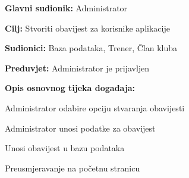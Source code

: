 \documentclass[times, utf8, zavrsni]{fer}
\newenvironment{packed_enum}{
	\begin{enumerate}
		\setlength{\itemsep}{0pt}
		\setlength{\parskip}{0pt}
		\setlength{\parsep}{0pt}
	}{\end{enumerate}}
\newenvironment{packed_item}{
	\begin{itemize}
		\setlength{\itemsep}{0pt}
		\setlength{\parskip}{0pt}
		\setlength{\parsep}{0pt}
	}{\end{itemize}}
\begin{document}
			\noindent {}
					\begin{packed_item}
						
						\item \textbf{Glavni sudionik: } Administrator
						\item  \textbf{Cilj:} Stvoriti obavijest za korisnike aplikacije
						\item  \textbf{Sudionici:} Baza podataka, Trener, Član kluba
						\item  \textbf{Preduvjet:} Administrator je prijavljen
						
						\item  \textbf{Opis osnovnog tijeka događaja:}
						
						\item[] \begin{packed_enum}
							
							\item Administrator odabire opciju stvaranja obavijesti
							\item Administrator unosi podatke za obavijest 
							\item Unosi obavijest u bazu podataka
							\item Preusmjeravanje na početnu stranicu
							
							
						\end{packed_enum}
						
					\end{packed_item}
\end{document}
